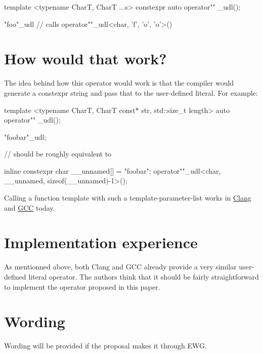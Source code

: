 \documentclass{wg21}
\begin{document}
\begin{cpp}
template <typename CharT, CharT ...s>
constexpr auto operator"" _udl();

"foo"_udl // calls operator""_udl<char, 'f', 'o', 'o'>()
\end{cpp}


\section{How would that work?}
The idea behind how this operator would work is that the compiler would
generate a constexpr string and pass that to the user-defined literal.
For example:

\begin{cpp}
template <typename CharT, CharT const* str, std::size_t length>
auto operator"" _udl();

"foobar"_udl;

// should be roughly equivalent to

inline constexpr char __unnamed[] = "foobar";
operator""_udl<char, __unnamed, sizeof(__unnamed)-1>();
\end{cpp}

Calling a function template with such a template-parameter-list works in
\href{https://wandbox.org/permlink/RB0EaL3jGr9auaO3}{Clang} and
\href{https://wandbox.org/permlink/6AJEsQdiUmngE14i}{GCC} today.


\section{Implementation experience}
As mentionned above, both Clang and GCC already provide a very similar
user-defined literal operator. The authors think that it should be fairly
straightforward to implement the operator proposed in this paper.


\section{Wording}
Wording will be provided if the proposal makes it through EWG.
\end{document}
